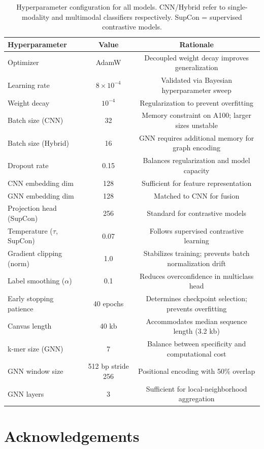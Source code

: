 \documentclass[12pt]{article}
\begin{document}
\begin{table}[h]
\centering
\begin{tabular}{lcc}
\hline
Hyperparameter & Value & Rationale \\
\hline
Optimizer & AdamW & Decoupled weight decay improves generalization \\
Learning rate & $8 \times 10^{-4}$ & Validated via Bayesian hyperparameter sweep \\
Weight decay & $10^{-4}$ & Regularization to prevent overfitting \\
Batch size (CNN) & 32 & Memory constraint on A100; larger sizes unstable \\
Batch size (Hybrid) & 16 & GNN requires additional memory for graph encoding \\
Dropout rate & 0.15 & Balances regularization and model capacity \\
CNN embedding dim & 128 & Sufficient for feature representation \\
GNN embedding dim & 128 & Matched to CNN for fusion \\
Projection head (SupCon) & 256 & Standard for contrastive models \\
Temperature ($\tau$, SupCon) & 0.07 & Follows supervised contrastive learning \\
Gradient clipping (norm) & 1.0 & Stabilizes training; prevents batch normalization drift \\
Label smoothing ($\alpha$) & 0.1 & Reduces overconfidence in multiclass head \\
Early stopping patience & 40 epochs & Determines checkpoint selection; prevents overfitting \\
Canvas length & 40 kb & Accommodates median sequence length (3.2 kb) \\
k-mer size (GNN) & 7 & Balance between specificity and computational cost \\
GNN window size & 512 bp stride 256 & Positional encoding with 50\% overlap \\
GNN layers & 3 & Sufficient for local-neighborhood aggregation \\
\hline
\end{tabular}
\caption{Hyperparameter configuration for all models. CNN/Hybrid refer to single-modality and multimodal classifiers respectively. SupCon = supervised contrastive models.}
\label{tab:hyperparams}
\end{table}

\newpage
\section*{Acknowledgements}
\end{document}
